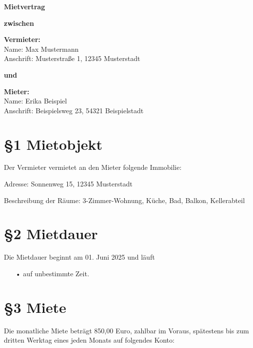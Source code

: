 \documentclass[12pt,a4paper]{article}
\begin{document}
\begin{center}
    \Huge \textbf{Mietvertrag}
\end{center}

\vspace{1cm}

\textbf{zwischen}

\vspace{0.3cm}

\textbf{Vermieter:}\\
Name: Max Mustermann\\
Anschrift: Musterstraße 1, 12345 Musterstadt

\vspace{0.5cm}

\textbf{und}

\vspace{0.3cm}

\textbf{Mieter:}\\
Name: Erika Beispiel\\
Anschrift: Beispielsweg 23, 54321 Beispielstadt

\vspace{1cm}

\section*{§1 Mietobjekt}
Der Vermieter vermietet an den Mieter folgende Immobilie:

\vspace{0.3cm}
Adresse: Sonnenweg 15, 12345 Musterstadt

\vspace{0.3cm}
Beschreibung der Räume: 3-Zimmer-Wohnung, Küche, Bad, Balkon, Kellerabteil

\vspace{0.5cm}

\section*{§2 Mietdauer}
Die Mietdauer beginnt am 01. Juni 2025 und läuft
\begin{itemize}
    \item[•] auf unbestimmte Zeit.
\end{itemize}

\vspace{0.5cm}

\section*{§3 Miete}
Die monatliche Miete beträgt 850,00 Euro, zahlbar im Voraus, spätestens bis zum dritten Werktag eines jeden Monats auf folgendes Konto:
\end{document}
